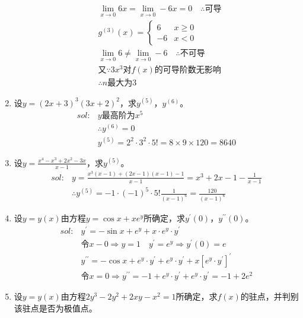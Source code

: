 \begin{enumerate}[{例}1.]
\begin{align*}
            &\lim_{x\to 0}6x=\lim_{x\to 0}-6x=0\quad\therefore \mbox{可导}\\
            &g^{(3)}(x)=\begin{cases} 6 & x\geq 0\\ -6 & x<0\end{cases}\\
            &\lim_{x\to 0}6\neq\lim_{x\to 0}-6\quad\therefore \mbox{不可导}\\
            &\mbox{又}\because 3x^3\mbox{对}f(x)\mbox{的可导阶数无影响}\\
            &\therefore n\mbox{最大为}3
        \end{align*}
    \item 设$y=(2x+3)^3(3x+2)^2$，求$y^{(5)}$，$y^{(6)}$。
        \begin{align*}
            sol:&y\mbox{最高阶为}x^5\\
                &\therefore y^{(6)}=0\\
                &y^{(5)}=2^2\cdot 3^2\cdot 5!=8\times 9\times 120=8640
        \end{align*}
    \item 设$y=\frac{x^4-x^3+2x^2-3x}{x-1}$，求$y^{(5)}$。
        \begin{align*}
            sol:&y=\frac{x^3(x-1)+(2x-1)(x-1)-1}{x-1}=x^3+2x-1-\frac{1}{x-1}\\
                &\therefore y^{(5)}=-1\cdot(-1)^5\cdot 5!\frac{1}{(x-1)^6}=\frac{120}{(x-1)^6}
        \end{align*}
    \item 设$y=y(x)$由方程$y=\cos x +xe^y$所确定，求$y^{\prime}(0)$，$y^{\prime\prime}(0)$。
        \begin{align*}
            sol:&y^{\prime}=-\sin x+e^y+x\cdot e^y\cdot y^{\prime}\\
                &\mbox{令}x-0\Rightarrow y=1\quad y^{\prime}=e^y\Rightarrow y^{\prime}(0)=e\\
                &y^{\prime\prime}=-\cos x+e^y\cdot y^{\prime}+e^y\cdot y^{\prime}+x[e^y\cdot y^{\prime}]^{\prime}\\
                &\mbox{令}x=0\Rightarrow y^{\prime\prime}=-1+e^y\cdot y^{\prime}+e^y\cdot y^{\prime}=-1+2e^2
        \end{align*}
    \item 设$y=y(x)$由方程$2y^3-2y^2+2xy-x^2 =1$所确定，求$f(x)$的驻点，并判别该驻点是否为极值点。
        \begin{align*}

\end{align*}
\end{enumerate}
